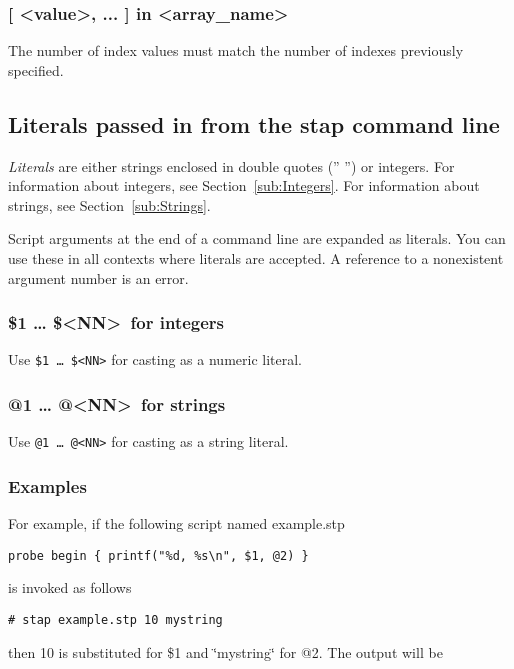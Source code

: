 \documentclass[twoside,english]{article}
\newenvironment{vindent}
{\begin{list}{}{\setlength{\listparindent}{6pt}}
\item[]}
{\end{list}}
\begin{document}
\subsubsection{{[} \textless value\textgreater, ... ] in \textless array\_name\textgreater}

The number of index values must match the number of indexes previously specified.


\subsection{Literals passed in from the stap command line\label{sub:Literals-passed-in}}
\emph{Literals} are either strings enclosed in double quotes ('' '') or
integers. For information about integers, see Section~\ref{sub:Integers}.
For information about strings, see Section~\ref{sub:Strings}.

Script arguments at the end of a command line are expanded as literals. You
can use these in all contexts where literals are accepted. A reference to
a nonexistent argument number is an error.


\subsubsection{\$1 \ldots{} \$\textless NN\textgreater\ for integers}
\index{\$}
Use \texttt{\$1 \ldots{} \$<NN>} for casting as a numeric literal.


\subsubsection{@1 \ldots{} @\textless NN\textgreater\ for strings}

Use \texttt{@1 \ldots{} @<NN>} for casting as a string literal.


\subsubsection{Examples}

For example, if the following script named example.stp

\begin{vindent}
\begin{verbatim}
probe begin { printf("%d, %s\n", $1, @2) }
\end{verbatim}
\end{vindent}
is invoked as follows

\begin{vindent}
\begin{verbatim}
# stap example.stp 10 mystring
\end{verbatim}
\end{vindent}
then 10 is substituted for \$1 and \char`\"{}mystring\char`\"{} for @2. The
output will be
\end{document}

